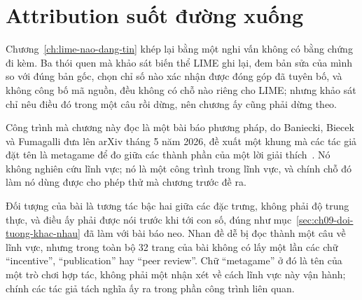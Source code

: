 %
%
\chapter{Attribution suốt đường xuống}
\label{ch:tro-choi-attribution}

Chương~\ref{ch:lime-nao-dang-tin} khép lại bằng một nghi vấn không có bằng
chứng đi kèm. Ba thói quen mà khảo sát biến thể LIME ghi lại, đem bản sửa của
mình so với đúng bản gốc, chọn chỉ số nào xác nhận được đóng góp đã tuyên bố,
và không công bố mã nguồn, đều không có chỗ nào riêng cho LIME; nhưng khảo sát
chỉ nêu điều đó trong một câu rồi dừng, nên chương ấy cũng phải dừng theo.

Công trình mà chương này đọc là một bài báo phương pháp, do Baniecki, Biecek và
Fumagalli đưa lên arXiv tháng 5 năm 2026, đề xuất một khung mà các tác giả đặt
tên là metagame để đo  giữa các
thành phần của một lời giải thích~\autocite{p23metagame}. Nó không nghiên cứu
lĩnh vực; nó là một công trình trong lĩnh vực, và chính chỗ đó làm nó dùng được
cho phép thử mà chương trước đề ra.

Đối tượng của bài là tương tác bậc hai giữa các đặc trưng, không phải độ trung
thực, và điều ấy phải được nói trước khi tới con số, đúng như
mục~\ref{sec:ch09-doi-tuong-khac-nhau} đã làm với bài báo neo. Nhan đề dễ bị
đọc thành một câu về lĩnh vực, nhưng trong toàn bộ 32 trang của bài không có
lấy một lần các chữ \enquote{incentive}, \enquote{publication} hay
\enquote{peer review}. Chữ \enquote{metagame} ở đó là tên của một trò chơi hợp
tác, không phải một nhận xét về cách lĩnh vực này vận hành; chính các tác giả
tách nghĩa ấy ra trong phần công trình liên quan.

